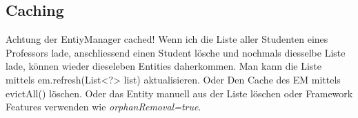 \subsection{Caching}
Achtung der EntiyManager cached! Wenn ich die Liste aller Studenten eines Professors lade, anschliessend einen Student lösche und nochmals diesselbe Liste lade, können wieder dieseleben Entities daherkommen. Man kann die Liste mittels em.refresh(List<?> list) aktualisieren. Oder Den Cache des EM mittels evictAll() löschen. Oder das Entity manuell aus der Liste löschen oder Framework Features verwenden wie \emph{orphanRemoval=true}.





